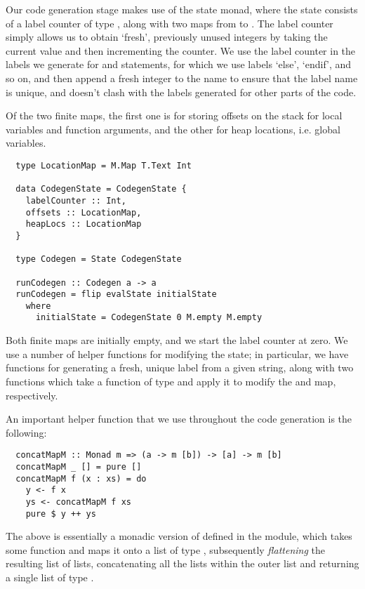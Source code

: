 Our code generation stage makes use of the state monad, where the state consists
of a label counter of type , along with two maps from
 to .
The label counter simply allows us to obtain `fresh', previously unused integers
by taking the current value and then incrementing the counter. We use the label
counter in the labels we generate for  and  statements, for
which we use labels `else', `endif', and so on, and then append a fresh integer
to the name to ensure that the label name is unique, and doesn't clash with the
labels generated for other parts of the code.

Of the two finite maps, the first one is for storing offsets on the stack for
local variables and function arguments, and the other for heap locations, i.e.
global variables.

\begin{verbatim}
  type LocationMap = M.Map T.Text Int

  data CodegenState = CodegenState {
    labelCounter :: Int,
    offsets :: LocationMap,
    heapLocs :: LocationMap
  }

  type Codegen = State CodegenState

  runCodegen :: Codegen a -> a
  runCodegen = flip evalState initialState
    where
      initialState = CodegenState 0 M.empty M.empty
\end{verbatim}

Both finite maps are initially empty, and we start the label counter at zero.
We use a number of helper functions for modifying the state; in particular, we
have functions for generating a fresh, unique label from a given string, along
with two functions which take a function of type
 and apply it to modify the
 and  map, respectively.

An important helper function that we use throughout the code generation is the
following:
\begin{verbatim}
  concatMapM :: Monad m => (a -> m [b]) -> [a] -> m [b]
  concatMapM _ [] = pure []
  concatMapM f (x : xs) = do
    y <- f x
    ys <- concatMapM f xs
    pure $ y ++ ys
\end{verbatim}
%
The above is essentially a monadic version of
 defined in the 
module, which takes some function  and maps it onto a
list of type \haskell{[a]}, subsequently \emph{flattening} the resulting
list of lists, concatenating all the lists within the outer list and returning
a single list of type \haskell{[b]}.

